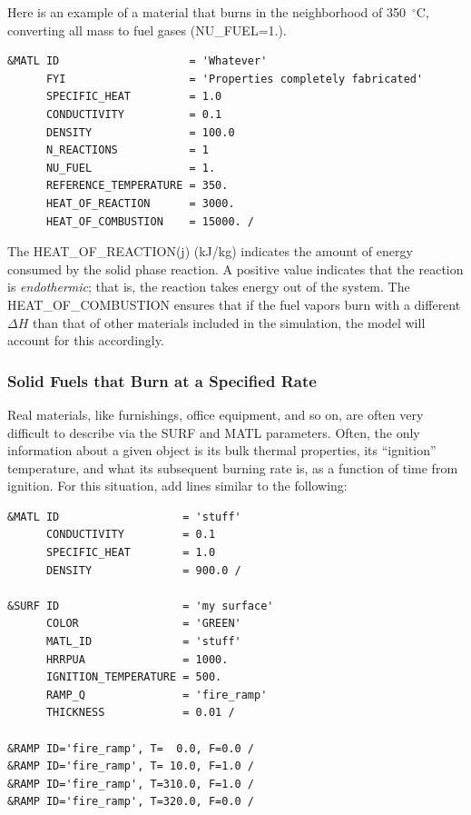 \documentclass[11pt]{book}
\begin{document}
Here is an example of a material that burns in the neighborhood of 350~$^\circ$C,
converting all mass to fuel gases ({\ct NU\_FUEL=1.}).

\footnotesize
\begin{verbatim}
&MATL ID                    = 'Whatever'
      FYI                   = 'Properties completely fabricated'
      SPECIFIC_HEAT         = 1.0
      CONDUCTIVITY          = 0.1
      DENSITY               = 100.0
      N_REACTIONS           = 1
      NU_FUEL               = 1.
      REFERENCE_TEMPERATURE = 350.
      HEAT_OF_REACTION      = 3000.
      HEAT_OF_COMBUSTION    = 15000. /
\end{verbatim}
\normalsize
\noindent
The {\ct HEAT\_OF\_REACTION(j)} (kJ/kg) indicates the amount of energy
consumed by the solid phase reaction. A positive value indicates that
the reaction is {\em endothermic}; that is, the reaction takes energy
out of the system. The {\ct HEAT\_OF\_COMBUSTION} ensures that if the
fuel vapors burn with a different $\Delta H$ than that of other
materials included in the simulation, the model will account for this
accordingly.

\subsubsection{Solid Fuels that Burn at a Specified Rate}

Real materials, like furnishings, office equipment, and so on, are
often very difficult to describe via the {\ct SURF} and {\ct MATL}
parameters. Often, the only information about a given object is its
bulk thermal properties, its ``ignition'' temperature, and what its
subsequent burning rate is, as a function of time from ignition. For
this situation, add lines similar to the following:

\footnotesize
\begin{verbatim}
&MATL ID                   = 'stuff'
      CONDUCTIVITY         = 0.1
      SPECIFIC_HEAT        = 1.0
      DENSITY              = 900.0 /

&SURF ID                   = 'my surface'
      COLOR                = 'GREEN'
      MATL_ID              = 'stuff'
      HRRPUA               = 1000.
      IGNITION_TEMPERATURE = 500.
      RAMP_Q               = 'fire_ramp'
      THICKNESS            = 0.01 /

&RAMP ID='fire_ramp', T=  0.0, F=0.0 /
&RAMP ID='fire_ramp', T= 10.0, F=1.0 /
&RAMP ID='fire_ramp', T=310.0, F=1.0 /
&RAMP ID='fire_ramp', T=320.0, F=0.0 /
\end{verbatim} \normalsize
\end{document}
